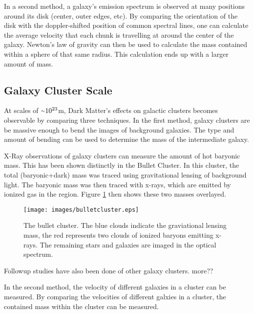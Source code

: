 In a second method, a galaxy's emission spectrum is observed at many positions around its disk (center, outer edges, etc).
By comparing the orientation of the disk with the doppler-shifted position of common spectral lines, one can calculate the average velocity that each chunk is travelling at around the center of the galaxy.
Newton's law of gravity can then be used to calculate the mass contained within a sphere of that same radius.
This calculation ends up with a larger amount of mass.

\subsection{Galaxy Cluster Scale}
%
At scales of $\nicetilde 10^{23}$m, Dark Matter's effects on galactic clusters becomes observable by comparing three techniques.
In the first method, galaxy clusters are be massive enough to bend the images of background galaxies.
The type and amount of bending can be used to determine the mass of the intermediate galaxy.

X-Ray observations of galaxy clusters can measure the amount of hot baryonic mass.
This has been shown distinctly in the Bullet Cluster\cite{bullet}.
In this cluster, the total (baryonic+dark) mass was traced using gravitational lensing of background light.
The baryonic mass was then traced with x-rays, which are emitted by ionized gas in the region.
Figure \ref{fig:bullet} then shows these two masses overlayed.

\begin{figure}[h]
  \begin{center}
    \texttt{[image: images/bulletcluster.eps]}
    \caption[The Bullet Cluster]{The bullet cluster\cite{bullet_cluster_combined_image}.  The blue clouds indicate the graviational lensing mass\cite{bullet_cluster}, the red represents two clouds of ionized baryons emitting x-rays\cite{bullet_cluster_chandramap}.  The remaining stars and galaxies are imaged in the optical spectrum\cite{bullet_cluster_composite}.}\label{fig:bullet}
  \end{center}
\end{figure}

Followup studies have also been done of other galaxy clusters.
more??


In the second method, the velocity of different galaxies in a cluster can be measured.
By comparing the velocities of different galxies in a cluster, the contained mass within the cluster can be measured.

